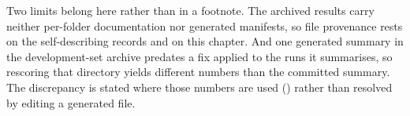 Two limits belong here rather than in a footnote. The archived results carry
neither per-folder documentation nor generated manifests, so file provenance
rests on the self-describing records and on this chapter. And one generated
summary in the development-set archive predates a fix applied to the runs it
summarises, so rescoring that directory yields different numbers than the
committed summary. The discrepancy is stated where those numbers are used
() rather than resolved by editing a generated file.

\endinput
